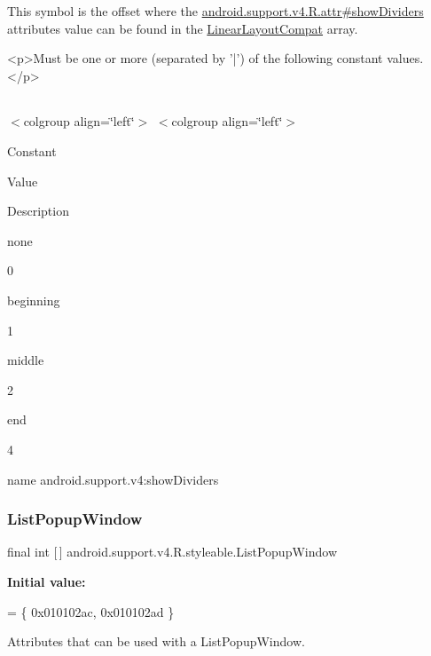 This symbol is the offset where the \hyperlink{classandroid_1_1support_1_1v4_1_1R_1_1attr_aa53445a82594ef89d4797d7d7180f8d8}{android.\+support.\+v4.\+R.\+attr\#show\+Dividers} attribute\textquotesingle{}s value can be found in the \hyperlink{classandroid_1_1support_1_1v4_1_1R_1_1styleable_a5410acb05d349e2b35bd2dbadc93b229}{Linear\+Layout\+Compat} array.

\begin{DoxyVerb}      <p>Must be one or more (separated by '|') of the following constant values.</p>
\end{DoxyVerb}
 \tabulinesep=1mm
\begin{longtabu} spread 0pt [c]{*{0}{|X[-1]}|}
\hline
\end{longtabu}
$<$colgroup align=\char`\"{}left\char`\"{}$>$ $<$colgroup align=\char`\"{}left\char`\"{}$>$ 

Constant

Value

Description 

{\ttfamily none}

0

{\ttfamily beginning}

1

{\ttfamily middle}

2

{\ttfamily end}

4

name android.\+support.\+v4\+:show\+Dividers \mbox{\label{classandroid_1_1support_1_1v4_1_1R_1_1styleable_ae85d6bb2c9931c00d078ecfff851c634}} 
\subsubsection{\texorpdfstring{List\+Popup\+Window}{ListPopupWindow}}
{\footnotesize\ttfamily final int \mbox{[}$\,$\mbox{]} android.\+support.\+v4.\+R.\+styleable.\+List\+Popup\+Window\hspace{0.3cm}{\ttfamily [static]}}

{\bfseries Initial value\+:}
\begin{DoxyCode}
= \{
            0x010102ac, 0x010102ad
        \}
\end{DoxyCode}
Attributes that can be used with a List\+Popup\+Window. 

